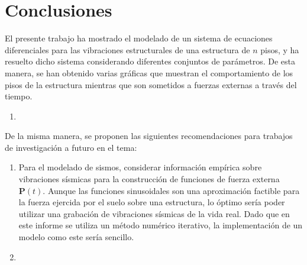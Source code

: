 \section{Conclusiones}

El presente trabajo ha mostrado el modelado de un sistema de ecuaciones diferenciales para las vibraciones estructurales de una estructura de \(n\) pisos, y ha resuelto dicho sistema considerando diferentes conjuntos de parámetros. De esta manera, se han obtenido varias gráficas que muestran el comportamiento de los pisos de la estructura mientras que son sometidos a fuerzas externas a través del tiempo.

\begin{enumerate}
    \item 
\end{enumerate}

De la misma manera, se proponen las siguientes recomendaciones para trabajos de investigación a futuro en el tema:

\begin{enumerate}
    \item Para el modelado de sismos, considerar información empírica sobre vibraciones sísmicas para la construcción de funciones de fuerza externa \(\mathbf{P}(t)\). Aunque las funciones sinusoidales son una aproximación factible para la fuerza ejercida por el suelo sobre una estructura, lo óptimo sería poder utilizar una grabación de vibraciones sísmicas de la vida real. Dado que en este informe se utiliza un método numérico iterativo, la implementación de un modelo como este sería sencillo.
    \item
\end{enumerate}